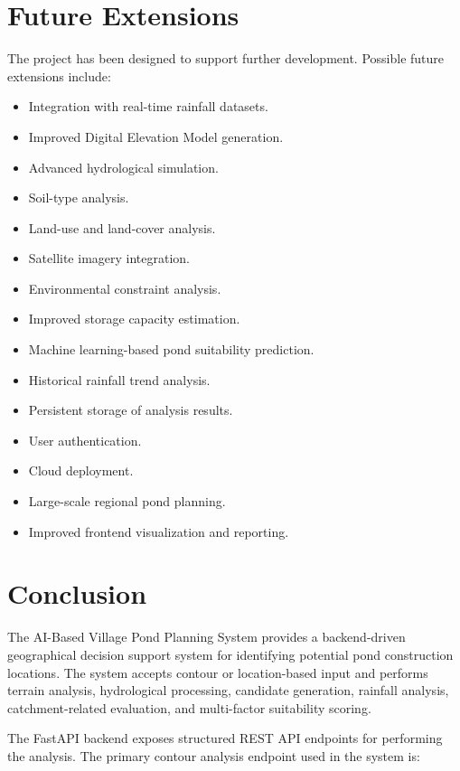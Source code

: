 \documentclass[12pt,a4paper]{article}
\begin{document}
\section{Future Extensions}

The project has been designed to support further development. Possible future extensions include:

\begin{itemize}
    \item Integration with real-time rainfall datasets.
    \item Improved Digital Elevation Model generation.
    \item Advanced hydrological simulation.
    \item Soil-type analysis.
    \item Land-use and land-cover analysis.
    \item Satellite imagery integration.
    \item Environmental constraint analysis.
    \item Improved storage capacity estimation.
    \item Machine learning-based pond suitability prediction.
    \item Historical rainfall trend analysis.
    \item Persistent storage of analysis results.
    \item User authentication.
    \item Cloud deployment.
    \item Large-scale regional pond planning.
    \item Improved frontend visualization and reporting.
\end{itemize}

\section{Conclusion}

The AI-Based Village Pond Planning System provides a backend-driven geographical
decision support system for identifying potential pond construction locations. The
system accepts contour or location-based input and performs terrain analysis,
hydrological processing, candidate generation, rainfall analysis, catchment-related
evaluation, and multi-factor suitability scoring.

The FastAPI backend exposes structured REST API endpoints for performing the analysis.
The primary contour analysis endpoint used in the system is:
\end{document}
